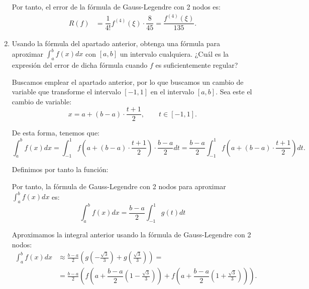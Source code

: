 \begin{ejercicio}
\begin{enumerate}
        Por tanto, el error de la fórmula de Gauss-Legendre con 2 nodos es:
        \begin{align*}
            R(f) &= \dfrac{1}{4!}f^{(4)}(\xi) \cdot \dfrac{8}{45} =\dfrac{f^{(4)}(\xi)}{135}.
        \end{align*}




        \item Usando la fórmula del apartado anterior, obtenga una fórmula para aproximar $\int_{a}^{b} f(x) dx$ con $[a, b]$ un intervalo cualquiera. ¿Cuál es la expresión del error de dicha fórmula cuando $f$ es suficientemente regular?
        
        Buscamos emplear el apartado anterior, por lo que buscamos un cambio de variable que transforme el intervalo $[-1,1]$ en el intervalo $[a,b]$. Sea este el cambio de variable:
        \begin{equation*}
            x = a + (b-a)\cdot \frac{t+1}{2}, \qquad t\in [-1,1].
        \end{equation*}

        De esta forma, tenemos que:
        \begin{equation*}
            \int_{a}^{b} f(x) dx = \int_{-1}^{1} f\left(a + (b-a)\cdot \frac{t+1}{2}\right) \cdot \frac{b-a}{2} dt
            = \frac{b-a}{2} \int_{-1}^{1} f\left(a + (b-a)\cdot \frac{t+1}{2}\right) dt.
        \end{equation*}

        Definimos por tanto la función:

        Por tanto, la fórmula de Gauss-Legendre con 2 nodos para aproximar $\int_{a}^{b} f(x) dx$ es:
        \begin{equation*}
            \int_{a}^{b} f(x) dx = \frac{b-a}{2}\int_{-1}^{1} g(t) dt
        \end{equation*}

        Aproximamos la integral anterior usando la fórmula de Gauss-Legendre con 2 nodos:
        \begin{align*}
            \int_{a}^{b} f(x) dx &\approx \frac{b-a}{2}\left(g\left(-\frac{\sqrt{3}}{3}\right) + g\left(\frac{\sqrt{3}}{3}\right)\right)
            =\\&= \frac{b-a}{2}\left(f\left(a + \dfrac{b-a}{2}\left(1 - \frac{\sqrt{3}}{3}\right)\right) + f\left(a + \dfrac{b-a}{2}\left(1 + \frac{\sqrt{3}}{3}\right)\right)\right).
        \end{align*}


\end{enumerate}
\end{ejercicio}
